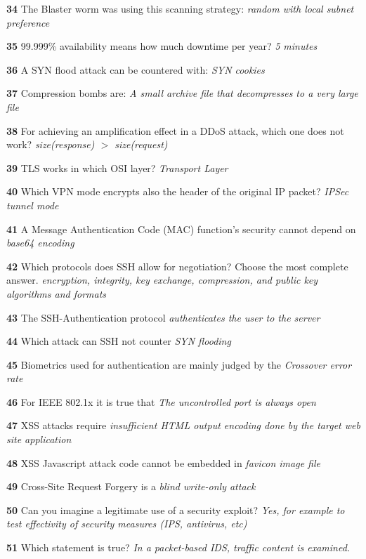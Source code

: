 \textbf{  34}  The Blaster worm was using this scanning strategy:  
\textit{ random with local subnet preference}

\textbf{  35}  99.999\% availability means how much downtime per year?  
\textit{ 5 minutes}

\textbf{  36}  A SYN flood attack can be countered with:  
\textit{ SYN cookies}

\textbf{  37}  Compression bombs are:  
\textit{ A small archive file that decompresses to a very large file}

\textbf{  38}  For achieving an amplification effect in a DDoS attack, which one does not work?  
\textit{ size(response) $>$ size(request)}

\textbf{  39}  TLS works in which OSI layer?  
\textit{ Transport Layer}

\textbf{  40}  Which VPN mode encrypts also the header of the original IP packet?  
\textit{ IPSec tunnel mode}

\textbf{  41}  A Message Authentication Code (MAC) function's security cannot depend on  
\textit{ base64 encoding}

\textbf{  42}  Which protocols does SSH allow for negotiation? Choose the most complete answer.  
\textit{ encryption, integrity, key exchange, compression, and public key algorithms and formats}

\textbf{  43}  The SSH-Authentication protocol  
\textit{ authenticates the user to the server}

\textbf{  44}  Which attack can SSH not counter  
\textit{ SYN flooding}

\textbf{  45}  Biometrics used for authentication are mainly judged by the  
\textit{ Crossover error rate}

\textbf{  46}  For IEEE 802.1x it is true that  
\textit{ The uncontrolled port is always open}

\textbf{  47}  XSS attacks require  
\textit{ insufficient HTML output encoding done by the target web site application}

\textbf{  48}  XSS Javascript attack code cannot be embedded in  
\textit{ favicon image file}

\textbf{  49}  Cross-Site Request Forgery is a  
\textit{ blind write-only attack}

\textbf{  50}  Can you imagine a legitimate use of a security exploit?  
\textit{ Yes, for example to test effectivity of security measures (IPS, antivirus, etc)}

\textbf{  51}  Which statement is true?  
\textit{ In a packet-based IDS, traffic content is examined.}

